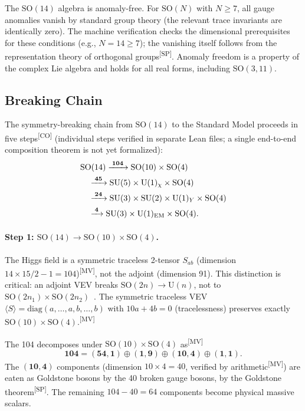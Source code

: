 \documentclass[aps,prd,twocolumn,showpacs,preprintnumbers,superscriptaddress,floatfix]{revtex4-2}
\newcommand{\MV}{\textsuperscript{[MV]}}
\newcommand{\CO}{\textsuperscript{[CO]}}
\newcommand{\SP}{\textsuperscript{[SP]}}
\begin{document}
The $\mathrm{SO}(14)$ algebra is anomaly-free.  For $\mathrm{SO}(N)$ with $N \geq 7$, all gauge anomalies vanish by standard group theory (the relevant trace invariants are identically zero).  The machine verification checks the dimensional prerequisites for these conditions (e.g., $N = 14 \geq 7$); the vanishing itself follows from the representation theory of orthogonal groups\SP.  Anomaly
freedom is a property of the complex Lie algebra and holds
for all real forms, including $\mathrm{SO}(3,11)$.

\subsection{Breaking Chain}
\label{sec:breaking}

The symmetry-breaking chain from $\mathrm{SO}(14)$ to the Standard
Model proceeds in five steps\CO{} (individual steps verified in separate Lean files; a single end-to-end composition theorem is not yet formalized):
\begin{align}\label{eq:chain}
  &\mathrm{SO}(14)
    \xrightarrow{\;\mathbf{104}\;}
  \mathrm{SO}(10) \times \mathrm{SO}(4) \notag \\
  &\quad \xrightarrow{\;\mathbf{45}\;}
  \mathrm{SU}(5) \times \mathrm{U}(1)_\chi \times \mathrm{SO}(4)
    \notag \\
  &\quad \xrightarrow{\;\mathbf{24}\;}
  \mathrm{SU}(3) \times \mathrm{SU}(2) \times \mathrm{U}(1)_Y
    \times \mathrm{SO}(4) \notag \\
  &\quad \xrightarrow{\;\mathbf{4}\;}
  \mathrm{SU}(3) \times \mathrm{U}(1)_\text{EM} \times \mathrm{SO}(4).
\end{align}

\paragraph{Step 1: $\mathrm{SO}(14) \to \mathrm{SO}(10) \times \mathrm{SO}(4)$.}
The Higgs field is a symmetric traceless 2-tensor $S_{ab}$
(dimension $14 \times 15/2 - 1 = 104$)\MV, not the adjoint
(dimension 91).  This distinction is critical: an adjoint VEV
breaks $\mathrm{SO}(2n) \to \mathrm{U}(n)$, not to
$\mathrm{SO}(2n_1) \times \mathrm{SO}(2n_2)$~\cite{li1974,michel1971}.
The symmetric traceless VEV
$\langle S \rangle = \mathrm{diag}(a, \ldots, a, b, \ldots, b)$ with
$10a + 4b = 0$ (tracelessness) preserves exactly $\mathrm{SO}(10) \times
\mathrm{SO}(4)$.\MV

The 104 decomposes under $\mathrm{SO}(10) \times \mathrm{SO}(4)$ as\MV
\begin{equation}
  \mathbf{104} = (\mathbf{54}, \mathbf{1}) \oplus (\mathbf{1}, \mathbf{9})
    \oplus (\mathbf{10}, \mathbf{4}) \oplus (\mathbf{1}, \mathbf{1}).
\end{equation}
The $(\mathbf{10}, \mathbf{4})$ components (dimension $10 \times 4 = 40$, verified by arithmetic\MV) are eaten as Goldstone
bosons by the 40 broken gauge bosons, by the Goldstone theorem\SP.  The remaining $104 - 40 = 64$ components
become physical massive scalars.
\end{document}
